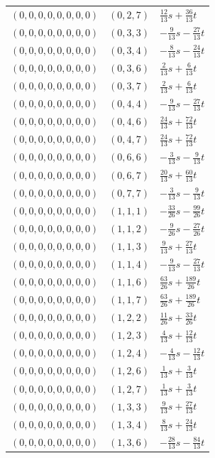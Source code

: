 \begin{longtable}{@{}lll@{}}
$(0,0,0,0,0,0,0,0)$ & $(0,2,7)$ & $\frac{12}{13}s+\frac{36}{13}t$\\
$(0,0,0,0,0,0,0,0)$ & $(0,3,3)$ & $-\frac{9}{13}s-\frac{27}{13}t$\\
$(0,0,0,0,0,0,0,0)$ & $(0,3,4)$ & $-\frac{8}{13}s-\frac{24}{13}t$\\
$(0,0,0,0,0,0,0,0)$ & $(0,3,6)$ & $\frac{2}{13}s+\frac{6}{13}t$\\
$(0,0,0,0,0,0,0,0)$ & $(0,3,7)$ & $\frac{2}{13}s+\frac{6}{13}t$\\
$(0,0,0,0,0,0,0,0)$ & $(0,4,4)$ & $-\frac{9}{13}s-\frac{27}{13}t$\\
$(0,0,0,0,0,0,0,0)$ & $(0,4,6)$ & $\frac{24}{13}s+\frac{72}{13}t$\\
$(0,0,0,0,0,0,0,0)$ & $(0,4,7)$ & $\frac{24}{13}s+\frac{72}{13}t$\\
$(0,0,0,0,0,0,0,0)$ & $(0,6,6)$ & $-\frac{3}{13}s-\frac{9}{13}t$\\
$(0,0,0,0,0,0,0,0)$ & $(0,6,7)$ & $\frac{20}{13}s+\frac{60}{13}t$\\
$(0,0,0,0,0,0,0,0)$ & $(0,7,7)$ & $-\frac{3}{13}s-\frac{9}{13}t$\\
$(0,0,0,0,0,0,0,0)$ & $(1,1,1)$ & $-\frac{33}{26}s-\frac{99}{26}t$\\
$(0,0,0,0,0,0,0,0)$ & $(1,1,2)$ & $-\frac{9}{26}s-\frac{27}{26}t$\\
$(0,0,0,0,0,0,0,0)$ & $(1,1,3)$ & $\frac{9}{13}s+\frac{27}{13}t$\\
$(0,0,0,0,0,0,0,0)$ & $(1,1,4)$ & $-\frac{9}{13}s-\frac{27}{13}t$\\
$(0,0,0,0,0,0,0,0)$ & $(1,1,6)$ & $\frac{63}{26}s+\frac{189}{26}t$\\
$(0,0,0,0,0,0,0,0)$ & $(1,1,7)$ & $\frac{63}{26}s+\frac{189}{26}t$\\
$(0,0,0,0,0,0,0,0)$ & $(1,2,2)$ & $\frac{11}{26}s+\frac{33}{26}t$\\
$(0,0,0,0,0,0,0,0)$ & $(1,2,3)$ & $\frac{4}{13}s+\frac{12}{13}t$\\
$(0,0,0,0,0,0,0,0)$ & $(1,2,4)$ & $-\frac{4}{13}s-\frac{12}{13}t$\\
$(0,0,0,0,0,0,0,0)$ & $(1,2,6)$ & $\frac{1}{13}s+\frac{3}{13}t$\\
$(0,0,0,0,0,0,0,0)$ & $(1,2,7)$ & $\frac{1}{13}s+\frac{3}{13}t$\\
$(0,0,0,0,0,0,0,0)$ & $(1,3,3)$ & $\frac{9}{13}s+\frac{27}{13}t$\\
$(0,0,0,0,0,0,0,0)$ & $(1,3,4)$ & $\frac{8}{13}s+\frac{24}{13}t$\\
$(0,0,0,0,0,0,0,0)$ & $(1,3,6)$ & $-\frac{28}{13}s-\frac{84}{13}t$\\

\end{longtable}
